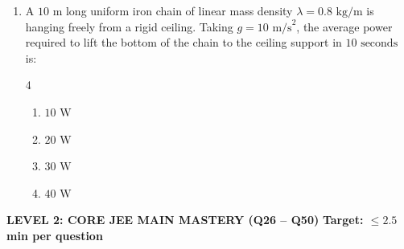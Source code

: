 \documentclass[11pt,a4paper]{article}
\begin{document}
\begin{enumerate}[label=\textbf{\arabic*.},leftmargin=18pt,itemsep=8pt]
  \item A $10\text{ m}$ long uniform iron chain of linear mass density $\lambda = 0.8\text{ kg/m}$ is hanging freely from a rigid ceiling. Taking $g = 10\text{ m/s}^2$, the average power required to lift the bottom of the chain to the ceiling support in $10\text{ seconds}$ is:
  \begin{multicols}{4}
    \begin{enumerate}[label=(\Alph*)]
      \item $10\text{ W}$
      \item $20\text{ W}$
      \item $30\text{ W}$
      \item $40\text{ W}$
    \end{enumerate}
  \end{multicols}

\end{enumerate}
\newpage


\begin{tcolorbox}[l2banner]
  {\large \textbf{\textsf{LEVEL 2: CORE JEE MAIN MASTERY (Q26 -- Q50)}}} \hfill {\small \textbf{Target: $\le 2.5$ min per question}}
\end{tcolorbox}
\vspace{4pt}
\end{document}
